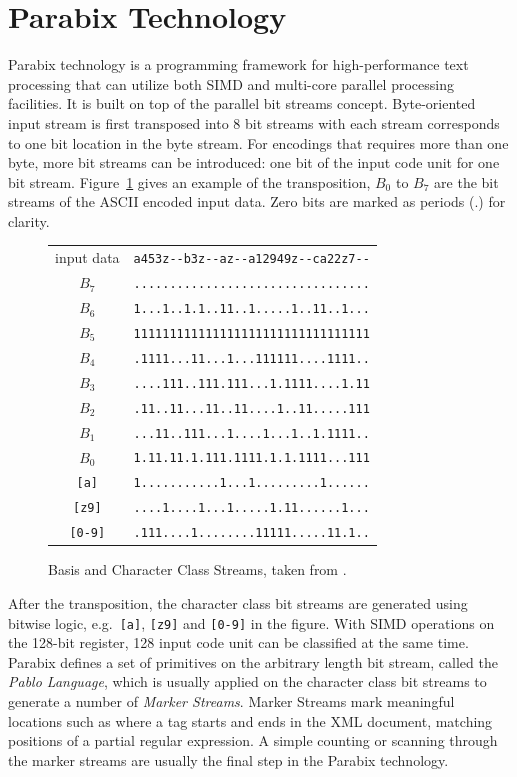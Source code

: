 \section{Parabix Technology}
Parabix technology is a programming framework for high-performance text processing that can utilize both SIMD and multi-core parallel processing facilities. It is built on top of the parallel bit streams concept. Byte-oriented input stream is first transposed into 8 bit streams with each stream corresponds to one bit location in the byte stream. For encodings that requires more than one byte, more bit streams can be introduced: one bit of the input code unit for one bit stream. Figure~\ref{figure:streams} gives an example of the transposition, $B_0$ to $B_7$ are the bit streams of the ASCII encoded input data. Zero bits are marked as periods (.) for clarity.

\begin{figure}[tbh]
\begin{center}
\begin{tabular}{cr}\\
input data  & \verb`a453z--b3z--az--a12949z--ca22z7--`\\
$B_7$ & \verb`.................................`\\
$B_6$ & \verb`1...1..1.1..11..1.....1..11..1...`\\
$B_5$ & \verb`111111111111111111111111111111111`\\
$B_4$ & \verb`.1111...11...1...111111....1111..`\\
$B_3$ & \verb`....111..111.111...1.1111....1.11`\\
$B_2$ & \verb`.11..11...11..11....1..11.....111`\\
$B_1$ & \verb`...11..111...1....1...1..1.1111..`\\
$B_0$ & \verb`1.11.11.1.111.1111.1.1.1111...111`\\
\verb:[a]: & \verb`1...........1...1.........1......`\\
\verb:[z9]: & \verb`....1....1...1.....1.11......1...`\\
\verb:[0-9]: & \verb`.111....1........11111.....11.1..`
\end{tabular}
\end{center}
\caption[Basis and Character Class Streams]{Basis and Character Class Streams, taken from \cite{rob_regex}.}
\label{figure:streams}
\end{figure}

After the transposition, the character class bit streams are generated using bitwise logic, e.g.\ \verb:[a]:, \verb:[z9]: and \verb:[0-9]: in the figure. With SIMD operations on the 128-bit register, 128 input code unit can be classified at the same time. Parabix defines a set of primitives on the arbitrary length bit stream, called the \textit{Pablo Language}, which is usually applied on the character class bit streams to generate a number of \textit{Marker Streams}. Marker Streams mark meaningful locations such as where a tag starts and ends in the XML document, matching positions of a partial regular expression. A simple counting or scanning through the marker streams are usually the final step in the Parabix technology.


